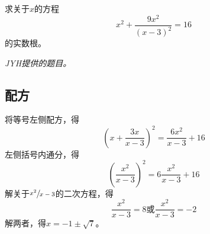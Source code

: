 

求关于$x$的方程
\[ x^2 + \frac{9x^2}{(x - 3)^2} = 16 \]
的实数根。

\textit{JYH提供的题目。}


\subsection{配方}

将等号左侧配方，得
\[ \left(x + \frac{3x}{x - 3}\right)^2 = \frac{6x^2}{x - 3} + 16 \]
左侧括号内通分，得
\[ \left(\frac{x^2}{x - 3}\right)^2 = 6\frac{x^2}{x - 3} + 16 \]
解关于$\sfrac{x^2}{x - 3}$的二次方程，得
\[ \frac{x^2}{x - 3} = 8 \text{或} \frac{x^2}{x - 3} = -2 \]
解两者，得$x = -1 \pm \sqrt7$。
